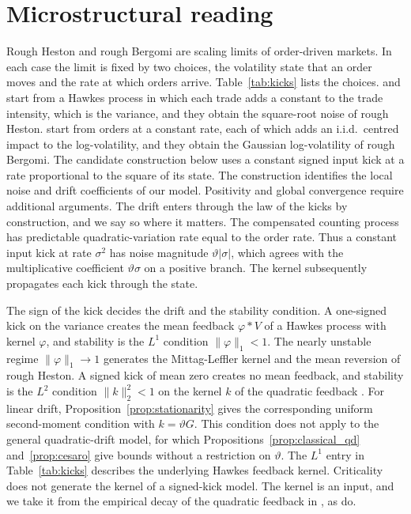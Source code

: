 \documentclass{rQUF2e}
\theoremstyle{plain}
\theoremstyle{definition}
\theoremstyle{remark}
\begin{document}
\section{Microstructural reading}\label{sec:micro}

Rough Heston and rough Bergomi are scaling limits of order-driven markets. In each case the limit is fixed by two choices, the volatility state that an order moves and the rate at which orders arrive. Table~\ref{tab:kicks} lists the choices. \citet{JaissonRosenbaum2016} and \citet{ElEuchFukasawaRosenbaum2018} start from a Hawkes process in which each trade adds a constant to the trade intensity, which is the variance, and they obtain the square-root noise of rough Heston. \citet{HagerHorstWagenhoferXu2026} start from orders at a constant rate, each of which adds an i.i.d.\ centred impact to the log-volatility, and they obtain the Gaussian log-volatility of rough Bergomi. The candidate construction below uses a constant signed input kick at a rate proportional to the square of its state. The construction identifies the local noise and drift coefficients of our model. Positivity and global convergence require additional arguments. The drift enters through the law of the kicks by construction, and we say so where it matters. The compensated counting process has predictable quadratic-variation rate equal to the order rate. Thus a constant input kick at rate $\sigma^2$ has noise magnitude $\vartheta|\sigma|$, which agrees with the multiplicative coefficient $\vartheta\sigma$ on a positive branch. The kernel subsequently propagates each kick through the state.

\suppressfloats[t]

The sign of the kick decides the drift and the stability condition. A one-signed kick on the variance creates the mean feedback $\varphi*V$ of a Hawkes process with kernel $\varphi$, and stability is the $L^1$ condition $\|\varphi\|_1<1$. The nearly unstable regime $\|\varphi\|_1\to1$ generates the Mittag-Leffler kernel and the mean reversion of rough Heston. A signed kick of mean zero creates no mean feedback, and stability is the $L^2$ condition $\|k\|_2^2<1$ on the kernel $k$ of the quadratic feedback \citep{BlancDonierBouchaud2017}. For linear drift, Proposition~\ref{prop:stationarity} gives the corresponding uniform second-moment condition with $k=\vartheta G$. This condition does not apply to the general quadratic-drift model, for which Propositions~\ref{prop:classical_qd} and~\ref{prop:cesaro} give bounds without a restriction on $\vartheta$. The $L^1$ entry in Table~\ref{tab:kicks} describes the underlying Hawkes feedback kernel. Criticality does not generate the kernel of a signed-kick model. The kernel is an input, and we take it from the empirical decay of the quadratic feedback in \citet{BlancDonierBouchaud2017}, as \citet{GatheralJusselinRosenbaum2020} do.
\end{document}

